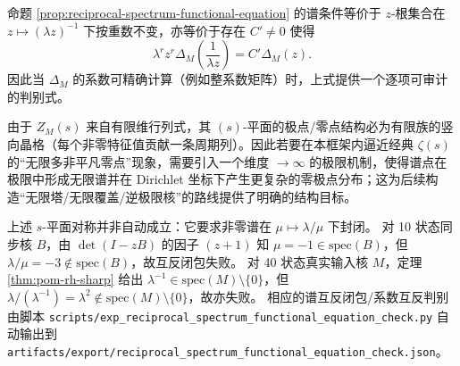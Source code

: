 \begin{remark}\label{rem:delta-reciprocal-polynomial}
命题 \ref{prop:reciprocal-spectrum-functional-equation} 的谱条件等价于 $z$-根集合在
\(
z\mapsto (\lambda z)^{-1}
\)
下按重数不变，亦等价于存在 $C'\neq 0$ 使得
\[
\lambda^{r}z^{r}\Delta_M\!\left(\frac{1}{\lambda z}\right)=C'\Delta_M(z).
\]
因此当 $\Delta_M$ 的系数可精确计算（例如整系数矩阵）时，上式提供一个逐项可审计的判别式。
\end{remark}

\begin{remark}\label{rem:finite-vs-infinite-zeros}
由于 \(Z_M(s)\) 来自有限维行列式，其 \((s)\)-平面的极点/零点结构必为有限族的竖向晶格（每个非零特征值贡献一条周期列）。因此若要在本框架内逼近经典 \(\zeta(s)\) 的“无限多非平凡零点”现象，需要引入一个维度 \(\to\infty\) 的极限机制，使得谱点在极限中形成无限谱并在 Dirichlet 坐标下产生更复杂的零极点分布；这为后续构造“无限塔/无限覆盖/逆极限核”的路线提供了明确的结构目标。
\end{remark}

\begin{remark}\label{rem:reciprocal-check-outcome}
上述 $s$-平面对称并非自动成立：它要求非零谱在 $\mu\mapsto\lambda/\mu$ 下封闭。
对 10 状态同步核 $B$，由 \(\det(I-zB)\) 的因子 \((z+1)\) 知 \(\mu=-1\in\mathrm{spec}(B)\)，但 \(\lambda/\mu=-3\notin\mathrm{spec}(B)\)，故互反闭包失败。
对 40 状态真实输入核 $M$，定理 \ref{thm:pom-rh-sharp} 给出 \(\lambda^{-1}\in\mathrm{spec}(M)\setminus\{0\}\)，但 \(\lambda/(\lambda^{-1})=\lambda^2\notin\mathrm{spec}(M)\setminus\{0\}\)，故亦失败。
相应的谱互反闭包/系数互反判别由脚本 \texttt{scripts/exp\_reciprocal\_spectrum\_functional\_equation\_check.py} 自动输出到
\texttt{artifacts/export/reciprocal\_spectrum\_functional\_equation\_check.json}。
\end{remark}
